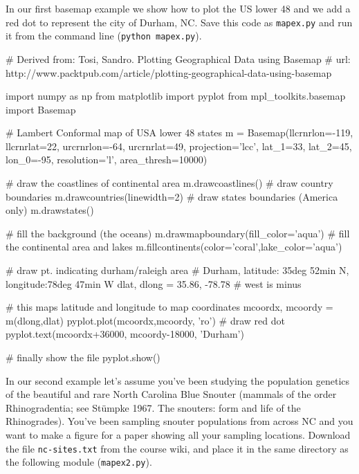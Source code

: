 In our first basemap example we show how to plot the US lower 48 and we
add a red dot to represent the city of Durham, NC. Save this code as
\lstinline!mapex.py! and run it from the command line
(\lstinline!python mapex.py!).

\begin{python}
# Derived from: Tosi, Sandro. Plotting Geographical Data using Basemap
# url: http://www.packtpub.com/article/plotting-geographical-data-using-basemap

import numpy as np
from matplotlib import pyplot
from mpl_toolkits.basemap import Basemap

# Lambert Conformal map of USA lower 48 states
m = Basemap(llcrnrlon=-119, llcrnrlat=22, urcrnrlon=-64,
  urcrnrlat=49, projection='lcc', lat_1=33, lat_2=45,
  lon_0=-95, resolution='l', area_thresh=10000)

# draw the coastlines of continental area
m.drawcoastlines()
# draw country boundaries
m.drawcountries(linewidth=2)
# draw states boundaries (America only)
m.drawstates()

# fill the background (the oceans)
m.drawmapboundary(fill_color='aqua')
# fill the continental area and lakes
m.fillcontinents(color='coral',lake_color='aqua')

# draw pt. indicating durham/raleigh area
# Durham, latitude:  35deg 52min N, longitude:78deg 47min W
dlat, dlong = 35.86, -78.78 # west is minus

# this maps latitude and longitude to map coordinates
mcoordx, mcoordy = m(dlong,dlat)
pyplot.plot(mcoordx,mcoordy, 'ro') # draw red dot
pyplot.text(mcoordx+36000, mcoordy-18000, 'Durham')

# finally show the file
pyplot.show()    
\end{python}
In our second example let's assume you've been studying the population
genetics of the beautiful and rare North Carolina Blue Snouter (mammals
of the order Rhinogradentia; see Stümpke 1967. The snouters: form and
life of the Rhinogrades). You've been sampling snouter populations from
across NC and you want to make a figure for a paper showing all your
sampling locations. Download the file \lstinline!nc-sites.txt! from the
course wiki, and place it in the same directory as the following module
(\lstinline!mapex2.py!).

